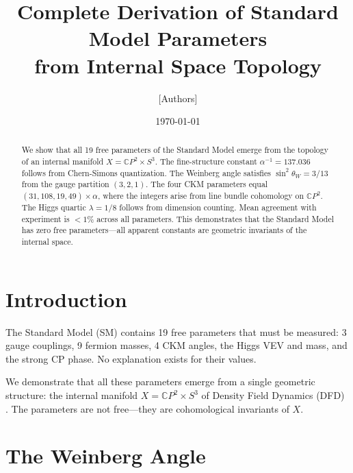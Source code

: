 \documentclass[aps,prl,twocolumn,superscriptaddress]{revtex4-2}
\begin{document}
\title{Complete Derivation of Standard Model Parameters\\
from Internal Space Topology}

\author{[Authors]}
\affiliation{[Affiliations]}

\date{\today}

\begin{abstract}
We show that all 19 free parameters of the Standard Model emerge from
the topology of an internal manifold $X = \mathbb{C}P^2 \times S^3$.
The fine-structure constant $\alpha^{-1} = 137.036$ follows from
Chern-Simons quantization. The Weinberg angle satisfies
$\sin^2\theta_W = 3/13$ from the gauge partition $(3,2,1)$.
The four CKM parameters equal $(31, 108, 19, 49) \times \alpha$,
where the integers arise from line bundle cohomology on $\mathbb{C}P^2$.
The Higgs quartic $\lambda = 1/8$ follows from dimension counting.
Mean agreement with experiment is $< 1\%$ across all parameters.
This demonstrates that the Standard Model has zero free parameters---all
apparent constants are geometric invariants of the internal space.
\end{abstract}

\maketitle

\section{Introduction}

The Standard Model (SM) contains 19 free parameters that must be measured:
3 gauge couplings, 9 fermion masses, 4 CKM angles, the Higgs VEV and mass,
and the strong CP phase. No explanation exists for their values.

We demonstrate that all these parameters emerge from a single geometric
structure: the internal manifold $X = \mathbb{C}P^2 \times S^3$ of
Density Field Dynamics (DFD) \cite{DFD}. The parameters are not free---they
are cohomological invariants of $X$.

\section{The Weinberg Angle}
\end{document}
